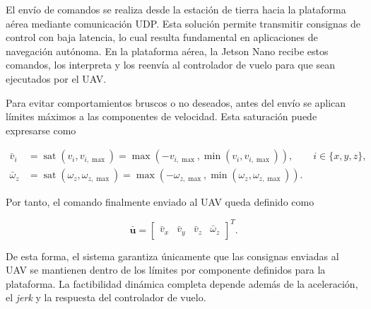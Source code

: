 El envío de comandos se realiza desde la estación de tierra hacia la plataforma aérea mediante comunicación UDP. Esta 
solución permite transmitir consignas de control con baja latencia, lo cual resulta fundamental en aplicaciones de 
navegación autónoma. En la plataforma aérea, la Jetson Nano recibe estos comandos, los interpreta y los reenvía al 
controlador de vuelo para que sean ejecutados por el UAV.

Para evitar comportamientos bruscos o no deseados, antes del envío se aplican límites máximos a las componentes de 
velocidad. Esta saturación puede expresarse como

\begin{equation}
\begin{aligned}
    \bar{v}_i
    &=
    \operatorname{sat}
    \left(
        v_i,
        v_{i,\max}
    \right)
    =
    \max
    \left(
        -v_{i,\max},
        \min
        \left(
            v_i,
            v_{i,\max}
        \right)
    \right),
    \qquad
    i \in \{x,y,z\},
    \\[2mm]
    \bar{\omega}_z
    &=
    \operatorname{sat}
    \left(
        \omega_z,
        \omega_{z,\max}
    \right)
    =
    \max
    \left(
        -\omega_{z,\max},
        \min
        \left(
            \omega_z,
            \omega_{z,\max}
        \right)
    \right).
\end{aligned}
\end{equation}

Por tanto, el comando finalmente enviado al UAV queda definido como

\begin{equation}
    \bar{\mathbf{u}}
    =
    \begin{bmatrix}
        \bar{v}_x &
        \bar{v}_y &
        \bar{v}_z &
        \bar{\omega}_z
    \end{bmatrix}^{T}.
\end{equation}

De esta forma, el sistema garantiza únicamente que las consignas enviadas al UAV se mantienen dentro de los límites por componente 
definidos para la plataforma. La factibilidad dinámica completa depende además de la aceleración, el \textit{jerk} y la respuesta del controlador de vuelo. 
